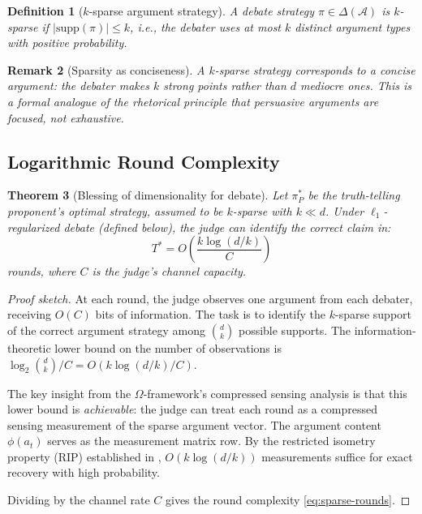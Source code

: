 \documentclass[11pt,a4paper]{article}
\newtheorem{theorem}{Theorem}[section]
\newtheorem{definition}[theorem]{Definition}
\newtheorem{remark}[theorem]{Remark}
\newcommand{\cA}{\mathcal{A}}
\begin{document}
\begin{definition}[$k$-sparse argument strategy]
A debate strategy $\pi \in \Delta(\cA)$ is \emph{$k$-sparse} if
$|\text{supp}(\pi)| \leq k$, i.e., the debater uses at most $k$
distinct argument types with positive probability.
\end{definition}

\begin{remark}[Sparsity as conciseness]
A $k$-sparse strategy corresponds to a concise argument: the debater
makes $k$ strong points rather than $d$ mediocre ones. This is a formal
analogue of the rhetorical principle that persuasive arguments are
focused, not exhaustive.
\end{remark}

\subsection{Logarithmic Round Complexity}

\begin{theorem}[Blessing of dimensionality for debate]
\label{thm:blessing-debate}
Let $\pi_P^*$ be the truth-telling proponent's optimal strategy,
assumed to be $k$-sparse with $k \ll d$. Under $\ell_1$-regularized
debate (defined below), the judge can identify the correct claim in:
\begin{equation}\label{eq:sparse-rounds}
    T^* = O\!\left(\frac{k \log(d/k)}{C}\right)
\end{equation}
rounds, where $C$ is the judge's channel capacity.
\end{theorem}

\begin{proof}[Proof sketch]
At each round, the judge observes one argument from each debater,
receiving $O(C)$ bits of information. The task is to identify the
$k$-sparse support of the correct argument strategy among $\binom{d}{k}$
possible supports. The information-theoretic lower bound on the number
of observations is $\log_2\binom{d}{k} / C = O(k\log(d/k)/C)$.

The key insight from the $\Omega$-framework's compressed sensing analysis
\cite{shcherbinin2026bless} is that this lower bound is \emph{achievable}:
the judge can treat each round as a compressed sensing measurement of the
sparse argument vector. The argument content $\phi(a_t)$ serves as the
measurement matrix row. By the restricted isometry property (RIP)
established in \cite{shcherbinin2026bless}, $O(k \log(d/k))$ measurements
suffice for exact recovery with high probability.

Dividing by the channel rate $C$ gives the round complexity
\eqref{eq:sparse-rounds}.
\end{proof}
\end{document}
